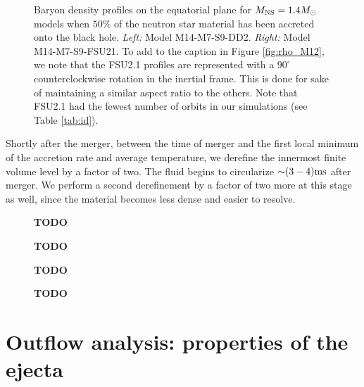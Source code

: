 \begin{figure}
\begin{subfigure}[b]{0.475\textwidth}
		\label{fig:rho_M14_FSU21}
		\centering
	\end{subfigure}
	\caption[Density profiles on equatorial plane for $1.4 M_{\odot}$ models]{
	Baryon density profiles on the equatorial plane for $M_{\rm NS} = 1.4 M_{\odot}$ models when $50\%$ of the neutron star material has been accreted onto the black hole.
	\textit{Left:} Model M14-M7-S9-DD2.
	\textit{Right:} Model M14-M7-S9-FSU21.
	To add to the caption in Figure \ref{fig:rho_M12}, we note that the FSU2.1 profiles are represented with a $90^{\circ}$ counterclockwise rotation in the inertial frame.  This is done for sake of maintaining a similar aspect ratio to the others.  Note that FSU2.1 had the fewest number of orbits in our simulations (see Table \ref{tab:id}). 
	}
	\label{fig:rho_M14}
\end{figure}

Shortly after the merger, between the time of merger and the first local minimum of the accretion rate and average temperature, we derefine the innermost finite volume level by a factor of two.  The fluid begins to circularize $\mathord{\sim} (3-4) {\rm ms}$ after merger.  We perform a second derefinement by a factor of two more at 
this stage as well, since the material becomes less dense and easier to resolve.

\begin{figure}
	\centering
	
	\caption[]{
		\textbf{TODO}
	}
	\label{fig:Yehisto}
\end{figure}

\begin{figure}
	\centering
	
	\caption[]{
		\textbf{TODO}
	}
	\label{fig:vrhisto}
\end{figure}

\begin{figure}
	\centering
	
	\caption[]{
		\textbf{TODO}
	}
	\label{fig:costhetahisto}
\end{figure}

\begin{figure}
	\centering
	
	\caption[]{
		\textbf{TODO}
	}
	\label{fig:phihisto}
\end{figure}



\section{Outflow analysis: properties of the ejecta}
\label{tailanalysis}

